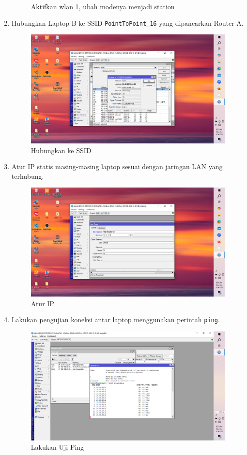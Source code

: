 \begin{enumerate}
\begin{figure}[H]
        \caption{Aktifkan wlan 1, ubah modenya menjadi station}
        \label{fig:gambar4}
    \end{figure}
    \item Hubungkan Laptop B ke SSID \texttt{PointToPoint\_16} yang dipancarkan Router A.
     \begin{figure}[H]
        \centering
        \includegraphics[width=0.5\linewidth]{P1/img/5.jpeg}
        \caption{Hubungkan ke SSID}
        \label{fig:gambar4}
    \end{figure}
    \item Atur IP statis masing-masing laptop sesuai dengan jaringan LAN yang terhubung.
     \begin{figure}[H]
        \centering
        \includegraphics[width=0.5\linewidth]{P1/img/7.jpeg}
        \caption{Atur IP}
        \label{fig:gambar4}
    \end{figure}
    \item Lakukan pengujian koneksi antar laptop menggunakan perintah \texttt{ping}.
     \begin{figure}[H]
        \centering
        \includegraphics[width=0.5\linewidth]{P1/img/8.jpeg}
        \caption{Lakukan Uji Ping}
        \label{fig:gambar4}
    \end{figure}

\end{enumerate}

